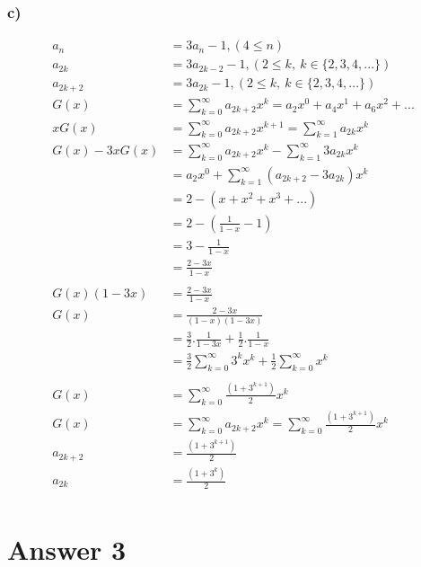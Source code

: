 \documentclass[12pt]{article}
\begin{document}
\subsubsection*{c)}
\begin{equation} 
\begin{split}
a_n & = 3a_n - 1, (4 \leq n) \\
a_{2k} & = 3a_{2k-2}-1, (2 \leq k,\ k \in \{2,3,4,...\}) \\ 
a_{2k+2} & = 3a_{2k}-1, (2 \leq k,\ k \in \{2,3,4,...\}) \\ 
G(x) & =\sum_{k=0}^{\infty}a_{2k+2}x^k = a_2x^0+a_4x^1+a_6x^2+...\\
xG(x) & =\sum_{k=0}^{\infty}a_{2k+2}x^{k+1}=\sum_{k=1}^{\infty}a_{2k}x^k \\ 
G(x)-3xG(x) 
& = \sum_{k=0}^{\infty}a_{2k+2}x^k-\sum_{k=1}^{\infty}3a_{2k}x^k \\
& = a_2x^0 + \sum_{k=1}^{\infty}(a_{2k+2}-3a_{2k})x^k \\
& = 2 - (x+x^2+x^3+...) \\
& = 2 - (\frac{1}{1-x}-1) \\
& = 3 - \frac{1}{1-x} \\
& = \frac{2-3x}{1-x} \\ \\
G(x)(1-3x) & =\frac{2-3x}{1-x}\\
G(x) & =\frac{2-3x}{(1-x)(1-3x)}\\
& = \frac{3}{2}.\frac{1}{1-3x}+\frac{1}{2}.\frac{1}{1-x} \\
& = \frac{3}{2}\sum_{k=0}^{\infty}3^kx^k+\frac{1}{2}\sum_{k=0}^{\infty}x^k \\ \\
G(x) & =  \sum_{k=0}^{\infty}\frac{(1+3^{k+1})}{2}x^k  \\
G(x) & =\sum_{k=0}^{\infty}a_{2k+2}x^k =  \sum_{k=0}^{\infty}\frac{(1+3^{k+1})}{2}x^k \\
a_{2k+2} & = \frac{(1+3^{k+1})}{2} \\
a_{2k} & = \frac{(1+3^k)}{2} \\
\end{split}
\end{equation}
\section*{Answer 3}
\end{document}
